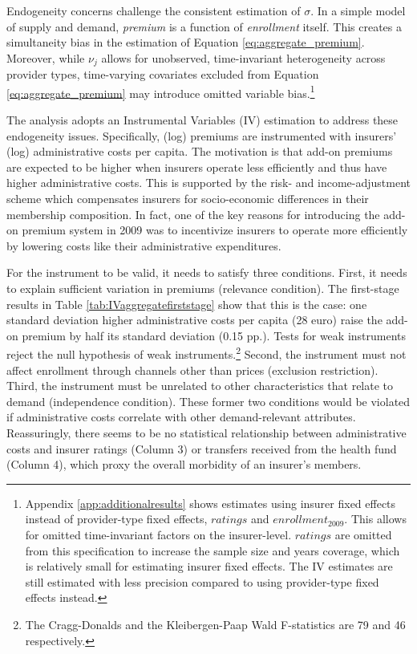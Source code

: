 \documentclass[a4paper, 11pt, english]{article}
\begin{document}
Endogeneity concerns challenge the consistent estimation of $\sigma$. In a simple model of supply and demand, \textit{premium} is a function of \textit{enrollment} itself. This creates a simultaneity bias in the estimation of Equation \eqref{eq:aggregate_premium}. Moreover, while $\nu_j$ allows for unobserved, time-invariant heterogeneity across provider types, time-varying covariates excluded from Equation \eqref{eq:aggregate_premium} may introduce omitted variable bias.\footnote{Appendix \ref{app:additionalresults} shows estimates using insurer fixed effects instead of provider-type fixed effects, $ratings$ and $enrollment_{2009}$. This allows for omitted time-invariant factors on the insurer-level. $ratings$ are omitted from this specification to increase the sample size and years coverage, which is relatively small for estimating insurer fixed effects. The IV estimates are still estimated with less precision compared to using provider-type fixed effects instead.} 

The analysis adopts an Instrumental Variables (IV) estimation to address these endogeneity issues. Specifically, (log) premiums are instrumented with insurers' (log) administrative costs per capita. The motivation is that add-on premiums are expected to be higher when insurers operate less efficiently and thus have higher administrative costs. This is supported by the risk- and income-adjustment scheme which compensates insurers for socio-economic differences in their membership composition. In fact, one of the key reasons for introducing the add-on premium system in 2009 was to incentivize insurers to operate more efficiently by lowering costs like their administrative expenditures.

For the instrument to be valid, it needs to satisfy three conditions. First, it needs to explain sufficient variation in premiums (relevance condition). The first-stage results in Table \ref{tab:IVaggregatefirststage} show that this is the case: one standard deviation higher administrative costs per capita (28 euro) raise the add-on premium by half its standard deviation (0.15 pp.). Tests for weak instruments reject the null hypothesis of weak instruments.\footnote{The Cragg-Donalds and the Kleibergen-Paap Wald F-statistics are 79 and 46 respectively.} Second, the instrument must not affect enrollment through channels other than prices (exclusion restriction). Third, the instrument must be unrelated to other characteristics that relate to demand (independence condition). These former two conditions would be violated if administrative costs correlate with other demand-relevant attributes. Reassuringly, there seems to be no statistical relationship between administrative costs and insurer ratings (Column 3) or transfers received from the health fund (Column 4), which proxy the overall morbidity of an insurer's members. 
\end{document}
